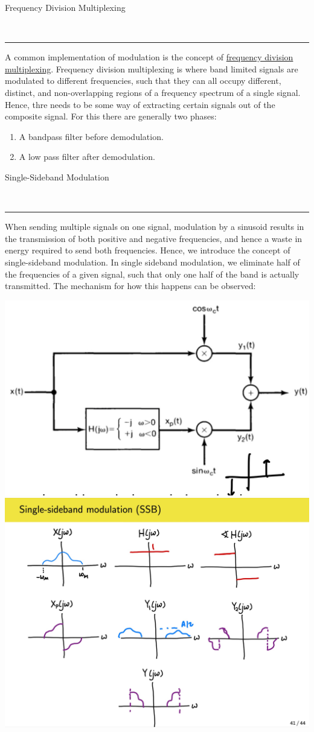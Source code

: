 \documentclass{article}
\newcommand{\header}[1]{\begin{large}\noindent #1\end{large}\\\rule{\textwidth}{0.5pt}}
\begin{document}
\pagebreak

\header{Frequency Division Multiplexing}
A common implementation of modulation is the concept of \underline{frequency division multiplexing}.
Frequency division multiplexing is where band limited signals are modulated to different 
frequencies, such that they can all occupy different, distinct, and non-overlapping regions 
of a frequency spectrum of a single signal. Hence, thre needs to be some way of 
extracting certain signals out of the composite signal. For this there are generally two 
phases:
\begin{enumerate}
    \item A bandpass filter before demodulation.
    \item A low pass filter after demodulation.
\end{enumerate}

\header{Single-Sideband Modulation}
When sending multiple signals on one signal, modulation by a sinusoid results in the 
transmission of both positive and negative frequencies, and hence a waste in energy required 
to send both frequencies. Hence, we introduce the concept of single-sideband modulation.
In single sideband modulation, we eliminate half of the frequencies of a given signal, such that
only one half of the band is actually transmitted. The mechanism for how this happens can
be observed:

\includegraphics[scale=0.2]{single-sideband.jpg}
\includegraphics[scale=0.1]{single-sideband-2.jpg}
\end{document}

